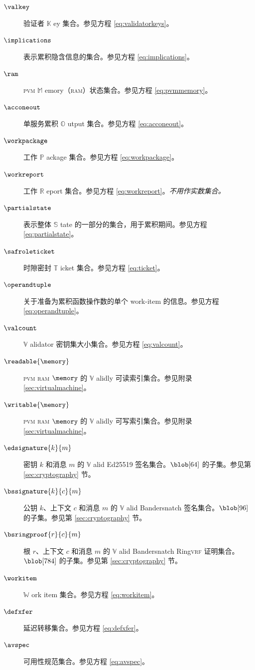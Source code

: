 \begin{description}
  \item[$\valkey$] 验证者 $\mathbb{K}$ ey 集合。参见方程 \ref{eq:validatorkeys}。
  \item[$\implications$] 表示累积隐含信息的集合。参见方程 \ref{eq:implications}。
  \item[$\ram$] \textsc{pvm} $\mathbb{M}$ emory（\textsc{ram}）状态集合。参见方程 \ref{eq:pvmmemory}。
  \item[$\acconeout$] 单服务累积 $\mathbb{O}$ utput 集合。参见方程 \ref{eq:acconeout}。
  \item[$\workpackage$] 工作 $\mathbb{P}$ ackage 集合。参见方程 \ref{eq:workpackage}。
  \item[$\workreport$] 工作 $\mathbb{R}$ eport 集合。参见方程 \ref{eq:workreport}。\emph{不用作实数集合。}
  \item[$\partialstate$] 表示整体 $\mathbb{S}$ tate 的一部分的集合，用于累积期间。参见方程 \ref{eq:partialstate}。
  \item[$\safroleticket$] 时隙密封 $\mathbb{T}$ icket 集合。参见方程 \ref{eq:ticket}。
  \item[$\operandtuple$] 关于准备为累积函数操作数的单个 work-item 的信息。参见方程 \ref{eq:operandtuple}。
  \item[$\valcount$] $\mathbb{V}$ alidator 密钥集大小集合。参见方程 \ref{eq:valcount}。
  \item[$\readable{\memory}$] \textsc{pvm} \textsc{ram} $\memory$ 的 $\mathbb{V}$ alidly 可读索引集合。参见附录 \ref{sec:virtualmachine}。
  \item[$\writable{\memory}$] \textsc{pvm} \textsc{ram} $\memory$ 的 $\mathbb{V}$ alidly 可写索引集合。参见附录 \ref{sec:virtualmachine}。
  \item[$\edsignature{k}{m}$] 密钥 $k$ 和消息 $m$ 的 $\mathbb{V}$ alid Ed25519 签名集合。$\blob[64]$ 的子集。参见第 \ref{sec:cryptography} 节。
  \item[$\bssignature{k}{c}{m}$] 公钥 $k$、上下文 $c$ 和消息 $m$ 的 $\mathbb{V}$ alid Bandersnatch 签名集合。$\blob[96]$ 的子集。参见第 \ref{sec:cryptography} 节。
  \item[$\bsringproof{r}{c}{m}$] 根 $r$、上下文 $c$ 和消息 $m$ 的 $\mathbb{V}$ alid Bandersnatch Ring\textsc{vrf} 证明集合。$\blob[784]$ 的子集。参见第 \ref{sec:cryptography} 节。
  \item[$\workitem$] $\mathbb{W}$ ork item 集合。参见方程 \ref{eq:workitem}。
  \item[$\defxfer$] 延迟转移集合。参见方程 \ref{eq:defxfer}。
  \item[$\avspec$] 可用性规范集合。参见方程 \ref{eq:avspec}。
\end{description}


